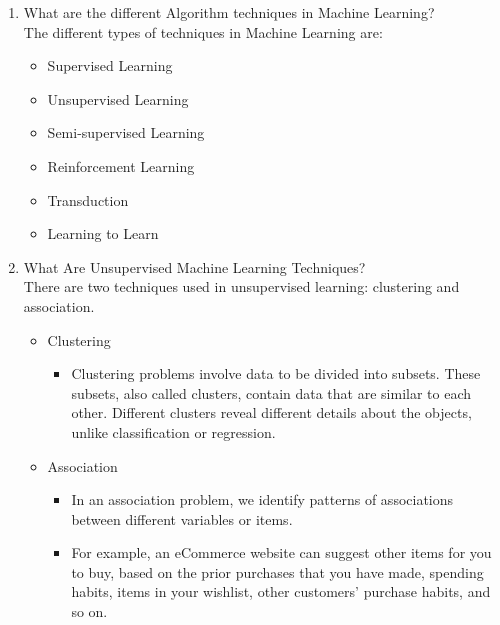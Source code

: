 \documentclass[11pt]{article}
\begin{document}
\begin{enumerate}
\pagebreak
\item What are the different Algorithm techniques in Machine Learning?\\[.5em]
The different types of techniques in Machine Learning are:
\begin{itemize}
\item Supervised Learning
\item Unsupervised Learning
\item Semi-supervised Learning
\item Reinforcement Learning
\item Transduction
\item Learning to Learn
\end{itemize}

\item What Are Unsupervised Machine Learning Techniques?\\[.5em]
There are two techniques used in unsupervised learning: clustering and association.
\begin{itemize}
\item Clustering
\begin{itemize}
\item Clustering problems involve data to be divided into subsets. These subsets, also called
clusters, contain data that are similar to each other. Different clusters reveal different
details about the objects, unlike classification or regression.
\end{itemize}
\item Association
\begin{itemize}
\item In an association problem, we identify patterns of associations between different
variables or items.
\item For example, an eCommerce website can suggest other items for you to buy, based on
the prior purchases that you have made, spending habits, items in your wishlist, other
customers’ purchase habits, and so on.
\end{itemize}
\end{itemize}
\end{enumerate}
\pagebreak
\end{document}
